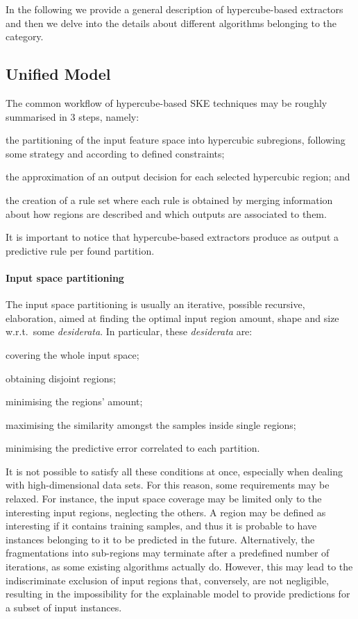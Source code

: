 \documentclass[
]{ceurart}
\begin{document}
In the following we provide a general description of hypercube-based extractors and then we delve into the details about different algorithms belonging to the category.

\subsection{Unified Model}

The common workflow of hypercube-based SKE techniques may be roughly summarised in 3 steps, namely:
%
\begin{inlinelist}
	\item the partitioning of the input feature space into hypercubic subregions, following some strategy and according to defined constraints;
	\item the approximation of an output decision for each selected hypercubic region; and
	\item the creation of a rule set where each rule is obtained by merging information about how regions are described and which outputs are associated to them.
\end{inlinelist}
%
It is important to notice that hypercube-based extractors produce as output a predictive rule per found partition.

\paragraph{Input space partitioning}

The input space partitioning is usually an iterative, possible recursive, elaboration, aimed at finding the optimal input region amount, shape and size w.r.t.\ some \emph{desiderata}.
%
In particular, these \emph{desiderata} are:
%
\begin{inlinelist}
	\item covering the whole input space;
	\item obtaining disjoint regions;
	\item minimising the regions' amount;
	\item maximising the similarity amongst the samples inside single regions;
	\item minimising the predictive error correlated to each partition.
\end{inlinelist}

It is not possible to satisfy all these conditions at once, especially when dealing with high-dimensional data sets.
%
For this reason, some requirements may be relaxed.
%
For instance, the input space coverage may be limited only to the interesting input regions, neglecting the others.
%
A region may be defined as interesting if it contains training samples, and thus it is probable to have instances belonging to it to be predicted in the future.
%
Alternatively, the fragmentations into sub-regions may terminate after a predefined number of iterations, as some existing algorithms actually do.
%
However, this may lead to the indiscriminate exclusion of input regions that, conversely, are not negligible, resulting in the impossibility for the explainable model to provide predictions for a subset of input instances.
\end{document}
